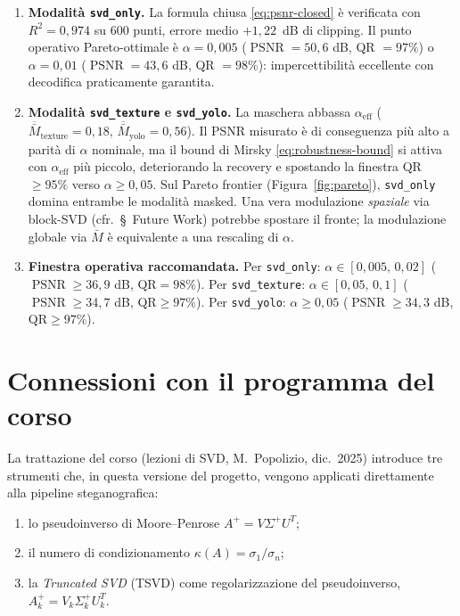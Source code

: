 \documentclass[11pt,a4paper]{article}
\theoremstyle{definition}
\theoremstyle{remark}
\DeclareMathOperator{\PSNR}{PSNR}
\begin{document}
\begin{enumerate}[leftmargin=*,itemsep=3pt]
  \item \textbf{Modalit\`a \texttt{svd\_only}.}  La formula chiusa
        \eqref{eq:psnr-closed} \`e verificata con $R^{2} = 0{,}974$ su
        600 punti, errore medio $+1{,}22$~dB di clipping.  Il punto
        operativo Pareto-ottimale \`e $\alpha = 0{,}005$
        ($\PSNR = 50{,}6$ dB, QR $= 97\%$) o $\alpha = 0{,}01$
        ($\PSNR = 43{,}6$ dB, QR $= 98\%$): impercettibilit\`a
        eccellente con decodifica praticamente garantita.
  \item \textbf{Modalit\`a \texttt{svd\_texture} e \texttt{svd\_yolo}.}
        La maschera abbassa $\alpha_{\text{eff}}$
        ($\overline{\bar M}_{\text{texture}} = 0{,}18$,
        $\overline{\bar M}_{\text{yolo}} = 0{,}56$).  Il PSNR misurato
        \`e di conseguenza pi\`u alto a parit\`a di $\alpha$ nominale,
        ma il bound di Mirsky \eqref{eq:robustness-bound} si attiva
        con $\alpha_{\text{eff}}$ pi\`u piccolo, deteriorando la
        recovery e spostando la finestra QR$\geq 95\%$ verso
        $\alpha \geq 0{,}05$.  Sul Pareto frontier
        (Figura~\ref{fig:pareto}), \verb|svd_only| domina entrambe le
        modalit\`a masked.  Una vera modulazione \emph{spaziale} via
        block-SVD (cfr.\ \S~Future Work) potrebbe spostare il fronte;
        la modulazione globale via $\bar M$ \`e equivalente a una
        rescaling di $\alpha$.
  \item \textbf{Finestra operativa raccomandata.}  Per
        \texttt{svd\_only}: $\alpha\in[0{,}005,\,0{,}02]$
        ($\PSNR\geq 36{,}9$ dB, QR$= 98\%$). Per
        \texttt{svd\_texture}: $\alpha\in[0{,}05,\,0{,}1]$
        ($\PSNR\geq 34{,}7$ dB, QR$\geq 97\%$).  Per
        \texttt{svd\_yolo}: $\alpha\geq 0{,}05$
        ($\PSNR\geq 34{,}3$ dB, QR$\geq 97\%$).
\end{enumerate}


\section{Connessioni con il programma del corso}
\label{sec:course-aligned}

La trattazione del corso (lezioni di SVD, M.\ Popolizio, dic.\ 2025)
introduce tre strumenti che, in questa versione del progetto, vengono
applicati direttamente alla pipeline steganografica:

\begin{enumerate}[leftmargin=*,itemsep=2pt]
  \item lo pseudoinverso di Moore--Penrose $A^{+} = V \Sigma^{+} U^{T}$;
  \item il numero di condizionamento $\kappa(A) = \sigma_1/\sigma_n$;
  \item la \emph{Truncated SVD} (TSVD) come regolarizzazione del
        pseudoinverso, $A_k^{+} = V_k \Sigma_k^{+} U_k^{T}$.
\end{enumerate}
\end{document}
